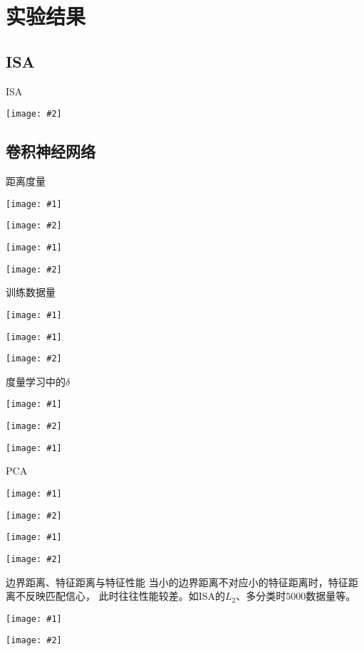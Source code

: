 \documentclass {beamer}
\newcommand{\addgraph}[2]{\begin{center}
\texttt{[image: \#2]}\end{center}}
\newcommand{\addtwocolplot}[2]{\centering
    \begin{minipage}{0.49\textwidth}
        \centering
        \texttt{[image: \#1]}
    \end{minipage}
    \begin{minipage}{0.49\textwidth}
        \centering
        \texttt{[image: \#2]}
    \end{minipage}
}
\newcommand{\addplottcs}[1]{\begin{center}
    \texttt{[image: \#1]}
\end{center}}
\begin{document}
\section{实验结果}

\subsection{ISA}
\begin{frame}{ISA}
    \addgraph{0.65}{res/expr/isa.pdf}
\end{frame}

\subsection{卷积神经网络}
\begin{frame}{距离度量}
    \addtwocolplot{res/expr/clsfy/measure/0.pdf}{res/expr/clsfy/measure/1.pdf}
    \addtwocolplot{res/expr/mtrc/measure/0-0.pdf}{res/expr/mtrc/measure/1-0.pdf}
\end{frame}

\begin{frame}{训练数据量}
    \addplottcs{res/expr/clsfy/datasize.pdf}
    \addtwocolplot{res/expr/mtrc/datasize/0.pdf}{res/expr/mtrc/datasize/1.pdf}
\end{frame}

\begin{frame}{度量学习中的$\delta$}
    \addtwocolplot{res/expr/mtrc/delta/0.pdf}{res/expr/mtrc/delta/1.pdf}
    \addplottcs{res/expr/mtrc/delta/2.pdf}
\end{frame}

\begin{frame}{PCA}
    \addtwocolplot{res/expr/clsfy/pca/0.pdf}{res/expr/clsfy/pca/1.pdf}
    \addtwocolplot{res/expr/mtrc/pca/0.pdf}{res/expr/mtrc/pca/1.pdf}
\end{frame}

\begin{frame}{边界距离、特征距离与特征性能}
    当小的边界距离不对应小的特征距离时，特征距离不反映匹配信心，
    此时往往性能较差。如ISA的$L_2$、多分类时$5000$数据量等。

    \vspace{1em}
    \addtwocolplot{res/expr/border-dist-stat/l2.pdf}
        {res/expr/border-dist-stat/cos.pdf}
\end{frame}
\end{document}
